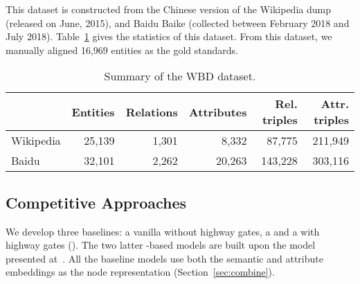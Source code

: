 	 This dataset is constructed from the Chinese version of the Wikipedia dump (released on June, 2015), and Baidu Baike (collected between February 2018 and July 2018).
    Table~\ref{dataset} gives the statistics of this dataset. From this dataset, we manually aligned 16,969 entities as the gold standards.

%	




	\begin{table}
	\centering
	\scriptsize
	\begin{tabular}{l|rrrrr}
		\toprule
		&\bf  Entities &\bf  Relations &\bf  Attributes &\bf  Rel. triples &\bf  Attr. triples \\
		\midrule
		Wikipedia & 25,139 & 1,301 & 8,332 & 87,775 & 211,949 \\
		Baidu & 32,101 & 2,262 & 20,263 & 143,228 & 303,116 \\
		\bottomrule
	\end{tabular}
	\caption{Summary of the WBD dataset.}
	\label{dataset}
\end{table}


	\subsection{Competitive Approaches}
	We develop three baselines: a vanilla \HRGCN without highway gates, a \GCN and a \GCN with highway gates (\HGCN). The two latter \GCN-based models are built upon the model presented at~\cite{Kipf2016Semi}.
    All the baseline models use both the semantic and attribute embeddings as the node representation (Section~\ref{sec:combine}).

